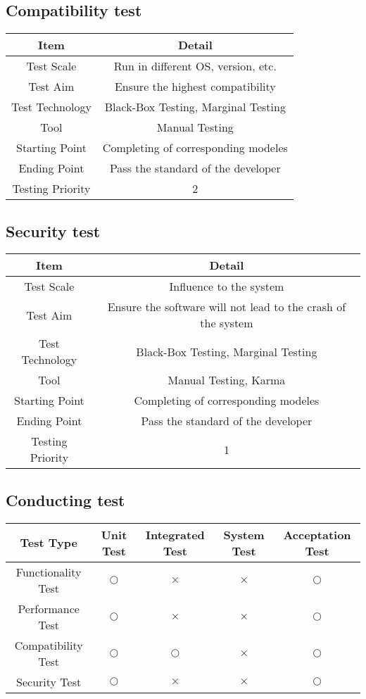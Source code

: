 \documentclass{article}
\begin{document}
	\subsection{Compatibility test}
	\begin{center}
			\begin{tabular}{cc}
			\toprule
			Item & Detail \\
			\midrule
			Test Scale & Run in different OS, version, etc.\\
			Test Aim & Ensure the highest compatibility\\
			Test Technology & Black-Box Testing, Marginal Testing\\
			Tool & Manual Testing\\
			Starting Point & Completing of corresponding modeles\\
			Ending Point & Pass the standard of the developer\\
			Testing Priority & 2 \\
			\bottomrule
			\end{tabular}
			\end{center}
	\subsection{Security test} 
	\begin{center}
			\begin{tabular}{cc}
			\toprule
			Item & Detail \\
			\midrule
			Test Scale & Influence to the system\\
			Test Aim & Ensure the software will not lead to the crash of the system\\
			Test Technology & Black-Box Testing, Marginal Testing\\
			Tool & Manual Testing, Karma\\
			Starting Point & Completing of corresponding modeles\\
			Ending Point & Pass the standard of the developer\\
			Testing Priority & 1 \\
			\bottomrule
			\end{tabular}
			\end{center}
	\subsection{Conducting test}
	\begin{center}
			\begin{tabular}{ccccc}
			\toprule
			Test Type & Unit Test & Integrated Test & System Test & Acceptation Test \\
			\midrule
			Functionality Test & $ \bigcirc $ & $ \times $ & $ \times $ & $ \bigcirc $\\
			Performance Test & $ \bigcirc $ & $ \times $ & $ \times $ & $ \bigcirc $\\
			Compatibility Test & $ \bigcirc $ & $ \bigcirc $ & $ \times $ & $ \bigcirc $\\
			Security Test & $ \bigcirc $ & $ \times $ & $ \times $ & $ \bigcirc $\\
			\bottomrule
			\end{tabular}
			\end{center}
\end{document}
